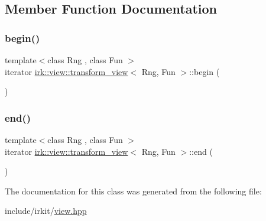\subsection{Member Function Documentation}
\mbox{\label{classirk_1_1view_1_1transform__view_a180fe7ed3c08b3189c3693320f292e30}} 
\subsubsection{\texorpdfstring{begin()}{begin()}}
{\footnotesize\ttfamily template$<$class Rng , class Fun $>$ \\
iterator \mbox{\hyperlink{classirk_1_1view_1_1transform__view}{irk\+::view\+::transform\+\_\+view}}$<$ Rng, Fun $>$\+::begin (\begin{DoxyParamCaption}{ }\end{DoxyParamCaption})\hspace{0.3cm}{\ttfamily [inline]}}

\mbox{\label{classirk_1_1view_1_1transform__view_a3dcf8d4581ef47b812141d79b9c47de1}} 
\subsubsection{\texorpdfstring{end()}{end()}}
{\footnotesize\ttfamily template$<$class Rng , class Fun $>$ \\
iterator \mbox{\hyperlink{classirk_1_1view_1_1transform__view}{irk\+::view\+::transform\+\_\+view}}$<$ Rng, Fun $>$\+::end (\begin{DoxyParamCaption}{ }\end{DoxyParamCaption})\hspace{0.3cm}{\ttfamily [inline]}}



The documentation for this class was generated from the following file\+:\begin{DoxyCompactItemize}
\item 
include/irkit/\mbox{\hyperlink{view_8hpp}{view.\+hpp}}\end{DoxyCompactItemize}
